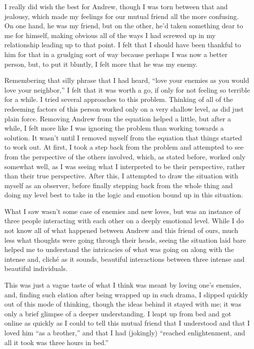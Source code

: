 I really did wish the best for Andrew, though I was torn between that and jealousy, which made my feelings for our mutual friend all the more confusing. On one hand, he was my friend, but on the other, he'd taken something dear to me for himself, making obvious all of the ways I had screwed up in my relationship leading up to that point. I felt that I should have been thankful to him for that in a grudging sort of way because perhaps I was now a better person, but, to put it bluntly, I felt more that he was my enemy.

Remembering that silly phrase that I had heard, ``love your enemies as you would love your neighbor,'' I felt that it was worth a go, if only for not feeling so terrible for a while. I tried several approaches to this problem. Thinking of all of the redeeming factors of this person worked only on a very shallow level, as did just plain force. Removing Andrew from the equation helped a little, but after a while, I felt more like I was ignoring the problem than working towards a solution. It wasn't until I removed myself from the equation that things started to work out. At first, I took a step back from the problem and attempted to see from the perspective of the others involved, which, as stated before, worked only somewhat well, as I was seeing what I interpreted to be their perspective, rather than their true perspective. After this, I attempted to draw the situation with myself as an observer, before finally stepping back from the whole thing and doing my level best to take in the logic and emotion bound up in this situation.

What I saw wasn't some case of enemies and new loves, but was an instance of three people interacting with each other on a deeply emotional level. While I do not know all of what happened between Andrew and this friend of ours, much less what thoughts were going through their heads, seeing the situation laid bare helped me to understand the intricacies of what was going on along with the intense and, cliché as it sounds, beautiful interactions between three intense and beautiful individuals.

This was just a vague taste of what I think was meant by loving one's enemies, and, finding such elation after being wrapped up in such drama, I slipped quickly out of this mode of thinking, though the ideas behind it stayed with me; it was only a brief glimpse of a deeper understanding. I leapt up from bed and got online as quickly as I could to tell this mutual friend that I understood and that I loved him ``as a brother,'' and that I had (jokingly) ``reached enlightenment, and all it took was three hours in bed.''

